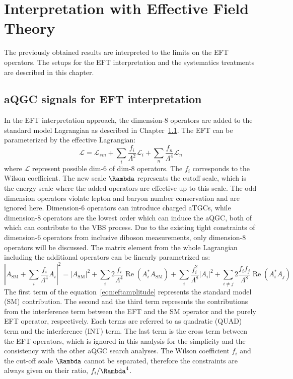 \chapter{Interpretation with Effective Field Theory}
\label{chap:aQGC}

The previously obtained results are interpreted to the limits on the EFT operators. The setups for the EFT interpretation and the systematics treatments are described in this chapter.
\section{aQGC signals for EFT interpretation}
In the EFT interpretation approach, the dimension-8 operators are added to the standard model Lagrangian as described in Chapter~\ref{}. 
The EFT can be parameterized by the effective Lagrangian:
\begin{equation}
  \mathcal{L}=\mathcal{L}_{sm}+\sum_{i}\frac{f_i}{\Lambda^{2}}\mathcal{L}_i+\sum_{n}\frac{f_n}{\Lambda^{4}}\mathcal{L}_n
\end{equation}
where $\mathcal{L}$ represent possible dim-6 of dim-8 operators.
The $f_i$ corresponds to the Wilson coefficient. The new scale $\Rambda$ represents the cutoff scale, which is the energy scale where the added operators are effective up to this scale. 
The odd dimension operators violate lepton and baryon number conservation and are ignored here.
Dimension-6 operators can introduce charged aTGCs, while dimension-8 operators are the lowest order which can induce the aQGC, both of which can contribute to the VBS process.
Due to the existing tight constraints of dimension-6 operators from inclusive diboson measurements, only dimension-8 operators will be discussed.
The matrix element from the whole Lagrangian including the additional operators can be linearly parametrized as:
\begin{equation}
\left|A_{\mathrm{SM}}+\sum_{i} \frac{f_{i}}{\Lambda^{4}} A_{i}\right|^{2}=\left|A_{\mathrm{SM}}\right|^{2}+\sum_{i} 2 \frac{f_{i}}{\Lambda^{4}} \operatorname{Re}\left(A_{i}^{*} A_{\mathrm{SM}}\right)+\sum_{i} \frac{f_{i}^{2}}{\Lambda^{8}}\left|A_{i}\right|^{2}+\sum_{i \neq j} 2 \frac{f_{i} f_{j}}{\Lambda^{8}} \operatorname{Re}\left(A_{i}^{*} A_{j}\right)
\label{eqn:eftamplitude}
\end{equation}
The first term of the equation~\ref{eqn:eftamplitude} represents the standard model (SM) contribution. The second and the third term represents the contributions from the interference term between the EFT and the SM operator and the purely EFT operator, respectively. Each terms are referred to as quadratic (QUAD) term and the interference (INT) term. The last term is the cross term between the EFT operators, which is ignored in this analysis for the simplicity and the consistency with the other aQGC search analyses. The Wilson coefficient $f_i$ and the cut-off scale $\Rambda$ cannot be separated, therefore the constraints are always given on their ratio, $f_i/\Rambda^4$.

